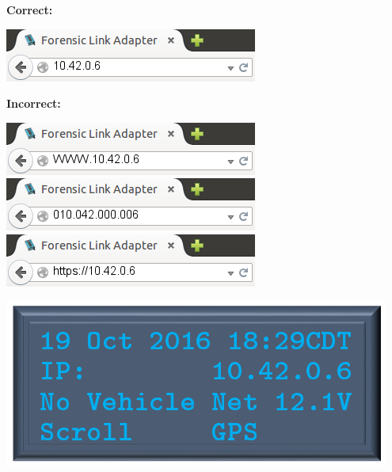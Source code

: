 \documentclass[11pt, oneside]{book}
\begin{document}
\noindent\begin{minipage}{0.45\textwidth}%
\begin{center}
\textbf{Correct:}\\[\baselineskip]
\end{center}
\includegraphics[width=\linewidth]{../media/fla_preview_screenshots/url_correct}
\begin{center}
\textbf{Incorrect:}\\[\baselineskip]
\end{center}
\includegraphics[width=\linewidth]{../media/fla_preview_screenshots/url_wrong_1}
\\[0.5\baselineskip]
\includegraphics[width=\linewidth]{../media/fla_preview_screenshots/url_wrong_2}
\\[0.5\baselineskip]
\includegraphics[width=\linewidth]{../media/fla_preview_screenshots/url_wrong_3}
\end{minipage}%
\hfill%
\begin{minipage}{0.45\textwidth}
\includegraphics[width=\linewidth]{../media/pstricks_files/01_main_screen_10_42_ip}
\end{minipage}
\end{document}
